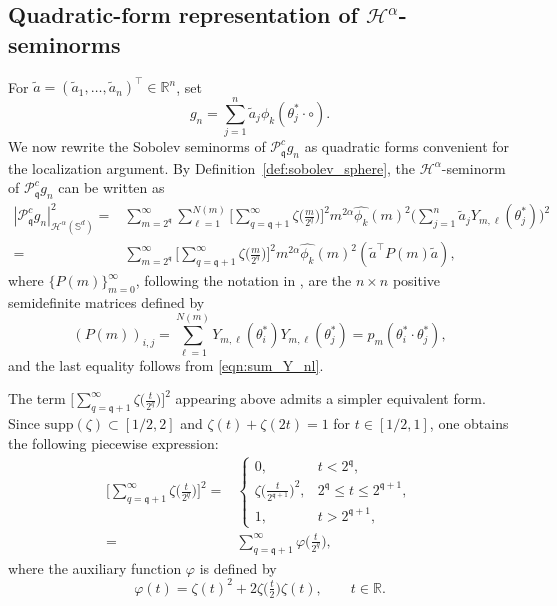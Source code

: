 \documentclass{article}
\numberwithin{equation}{section}
\def\RR{\mathbb{R}}
\def\SS{\mathbb{S}}
\def\sul{\sum\limits}
\def\pc{\mathcal{P}^c}
\def\mq{\mathfrak{q}}
\begin{document}
\subsection{Quadratic-form representation of $\mathcal{H}^\alpha$-seminorms}

For $\tilde a=(\tilde a_1,\dots,\tilde a_n)^\top\in\RR^n$, set
\[
g_n=\sul_{j=1}^n\tilde a_j\phi_k(\theta_j^*\cdot\circ).
\]
We now rewrite the Sobolev seminorms of $\pc_\mq g_n$ as quadratic forms convenient for the localization argument.
By Definition~\ref{def:sobolev_sphere}, the $\mathcal{H}^\alpha$-seminorm of $\pc_\mq g_n$ can be written as
\begin{equation}\label{eqn:Sobolev_norm_gn}
    \begin{split}
        |\pc_\mq g_n|_{\mathcal{H}^\alpha(\SS^d)}^2
        =&\sul_{m=2^\mq}^\infty \sul_{\ell=1}^{N(m)}
        \Big[\sul_{q=\mq+1}^\infty \zeta\big(\frac{m}{2^q}\big)\Big]^2
        m^{2\alpha}\widehat{\phi_k}(m)^2
        \Big(\sul_{j=1}^n\tilde{a}_jY_{m,\ell}(\theta_j^*)\Big)^2\\
        =&\sul_{m=2^\mq}^\infty
        \Big[\sul_{q=\mq+1}^\infty \zeta\big(\frac{m}{2^q}\big)\Big]^2
        m^{2\alpha}\widehat{\phi_k}(m)^2
        (\tilde{a}^\top P(m)\tilde{a}),
    \end{split}
\end{equation}
where $\{P(m)\}_{m=0}^\infty$, following the notation in \cite{liu2025integral}, are the $n\times n$ positive semidefinite matrices defined by
\begin{equation}
    (P(m))_{i,j}
    =\sul_{\ell=1}^{N(m)}Y_{m,\ell}(\theta_i^*)Y_{m,\ell}(\theta_j^*)
    =p_m(\theta_i^*\cdot\theta_j^*),
\end{equation}
and the last equality follows from \eqref{eqn:sum_Y_nl}.

\medskip
The term $\Big[\sul_{q=\mq+1}^\infty \zeta\big(\frac{t}{2^q}\big)\Big]^2$ appearing above admits a simpler equivalent form. 
Since $\mathrm{supp}(\zeta)\subset[1/2,2]$ and $\zeta(t)+\zeta(2t)=1$ for $t\in[1/2,1]$, one obtains the following piecewise expression:
\begin{equation}
    \begin{split}
        \Big[\sul_{q=\mq+1}^\infty \zeta\big(\frac{t}{2^q}\big)\Big]^2
        =&
        \left\{
        \begin{array}{ll}
        0, & t<2^\mq,\\[0.3em]
        \zeta\big(\frac{t}{2^{\mq+1}}\big)^2, & 2^\mq\le t\le2^{\mq+1}, \\[0.3em]
        1, & t>2^{\mq+1},
        \end{array}
        \right.\\
        =&\sul_{q=\mq+1}^\infty \varphi\big(\frac{t}{2^q}\big),
    \end{split}
\end{equation}
where the auxiliary function $\varphi$ is defined by
\begin{equation}
    \varphi(t)=\zeta(t)^2+2\zeta\!\big(\tfrac{t}{2}\big)\zeta(t),
    \qquad t\in\RR.
\end{equation}
\end{document}
